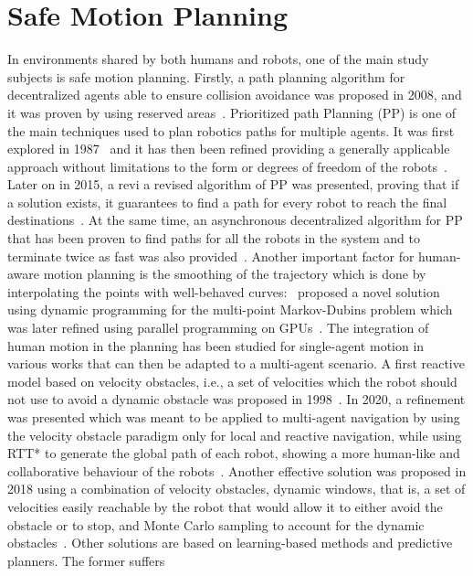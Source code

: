 \section{Safe Motion Planning}
In environments shared by both humans and robots, one of the main study
subjects is safe motion planning. Firstly, a path planning algorithm for
decentralized agents able to ensure collision avoidance was proposed in 2008,
and it was proven by using reserved areas~\cite{purwin2008}. Prioritized path
Planning (PP) is one of the main techniques used to plan robotics paths for
multiple agents. It was first explored in 1987~\cite{erdmann1987} and it has
then been refined providing a generally applicable approach without limitations
to the form or degrees of freedom of the robots~\cite{vandenberg2005}. Later on
in 2015, a revi a revised algorithm of PP was presented, proving that if a
solution exists, it guarantees to find a path for every robot to reach the
final destinations~\cite{michal2015}. At the same time, an asynchronous
decentralized algorithm for PP that has been proven to find paths for all the
robots in the system and to terminate twice as fast was also
provided~\cite{michal2015}. Another important factor for human-aware motion
planning is the smoothing of the trajectory which is done by interpolating the
points with well-behaved curves:~\cite{frego2020} proposed a novel solution
using dynamic programming for the multi-point Markov-Dubins problem which was
later refined using parallel programming on GPUs~\cite{saccon2021}. \newline
The integration of human motion in the planning has been studied for
single-agent motion in various works that can then be adapted to a multi-agent
scenario. A first reactive model based on velocity obstacles, i.e., a set of
velocities which the robot should not use to avoid a dynamic obstacle was
proposed in 1998~\cite{fiorini1998}. In 2020, a refinement was presented which
was meant to be applied to multi-agent navigation by using the velocity
obstacle paradigm only for local and reactive navigation, while using RTT* to
generate the global path of each robot, showing a more human-like and
collaborative behaviour of the robots~\cite{boldrer2020}. Another effective
solution was proposed in 2018 using a combination of velocity obstacles,
dynamic windows, that is, a set of velocities easily reachable by the robot
that would allow it to either avoid the obstacle or to stop, and Monte Carlo
sampling to account for the dynamic obstacles~\cite{claes2018}. Other solutions
are based on learning-based methods and predictive planners. The former suffers
